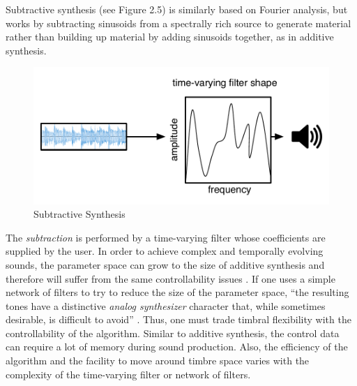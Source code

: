 \documentclass[12pt]{report} 	%
\numberwithin{figure}{chapter}
\numberwithin{table}{chapter}
\numberwithin{equation}{chapter}
\begin{document}
\begin{flushleft}
Subtractive synthesis (see Figure 2.5) is similarly based on Fourier analysis, but works by subtracting sinusoids from a spectrally rich source to generate material rather than building up material by adding sinusoids together, as in additive synthesis. 
\begin{figure}[h!]
\begin{center}
\includegraphics[scale=0.8]{SubtractiveSynthesis}
\caption[Subtractive synthesis]{Subtractive Synthesis}
\end{center}
\end{figure}
The \textit{subtraction} is performed by a time-varying filter whose coefficients are supplied by the user. In order to achieve complex and temporally evolving sounds, the parameter space can grow to the size of additive synthesis and therefore will suffer from the same controllability issues \cite[p. 48]{Tolonen:1998bh}. If one uses a simple network of filters to try to reduce the size of the parameter space, ``the resulting tones have a distinctive \textit{analog synthesizer} character that, while sometimes desirable, is difficult to avoid'' \cite[p. 5]{Vercoe:1998hh}. Thus, one must trade timbral flexibility with the controllability of the algorithm. Similar to additive synthesis, the control data can require a lot of memory during sound production. Also, the efficiency of the algorithm and the facility to move around timbre space varies with the complexity of the time-varying filter or network of filters.


\end{flushleft}
\end{document}
